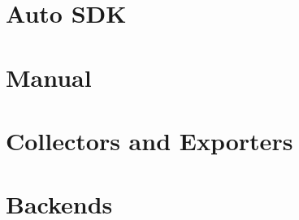 \documentclass[aspectratio=169]{beamer}
\begin{document}
\section{Auto SDK}
\section{Manual}

\section{Collectors and Exporters}

\section{Backends}




\end{document}
